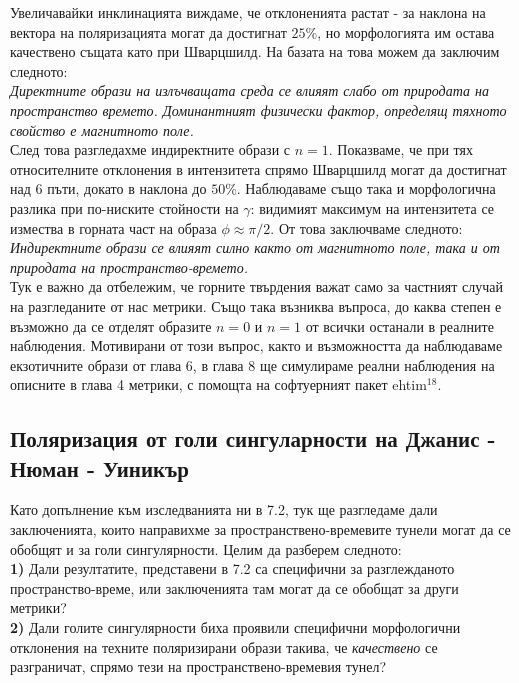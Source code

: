 Увеличавайки инклинацията виждаме, че отклоненията растат - за наклона на вектора на поляризацията могат да достигнат $25\%$, но морфологията им остава качествено същата като при Шварцшилд. На базата на това можем да заключим следното:\\

\emph{Директните образи на излъчващата среда се влияят слабо от природата на пространство времето. Доминантният физически фактор, определящ тяхното свойство е магнитното поле.}\\

След това разгледахме индиректните образи с $n = 1$. Показваме, че при тях относителните отклонения в интензитета спрямо Шварцшилд могат да достигнат над 6 пъти, докато в наклона до $50\%$. Наблюдаваме също така и морфологична разлика при по-ниските стойности на $\gamma$: видимият максимум на интензитета се измества в горната част на образа $\phi\approx\pi / 2$. От това заключваме следното:\\

\emph{Индиректните образи се влияят силно както от магнитното поле, така и от природата на пространство-времето.}\\

Тук е важно да отбележим, че горните твърдения важат само за частният случай на разгледаните от нас метрики. Също така възниква въпроса, до каква степен е възможно да се отделят образите $n = 0$ и $n = 1$ от всички останали в реалните наблюдения. Мотивирани от този въпрос, както и възможността да наблюдаваме екзотичните образи от глава 6, в глава 8 ще симулираме реални наблюдения на описните в глава 4 метрики, с помощта на софтуерният пакет ehtim$^{18}$.

\subsection{Поляризация от голи сингуларности на Джанис - Нюман - Уиникър}

Като допълнение към изследванията ни в 7.2, тук ще разгледаме дали заключенията, които направихме за пространствено-времевите тунели могат да се обобщят и за голи сингулярности. Целим да разберем следното:\\

\textbf{1)} Дали резултатите, представени в 7.2 са специфични за разглежданото пространство-време, или заключенията там могат да се обобщат за други метрики?\\

\textbf{2)} Дали голите сингулярности биха проявили специфични морфологични отклонения на техните поляризирани образи такива, че \emph{качествено} се разграничат, спрямо тези на пространствено-времевия тунел?\\

